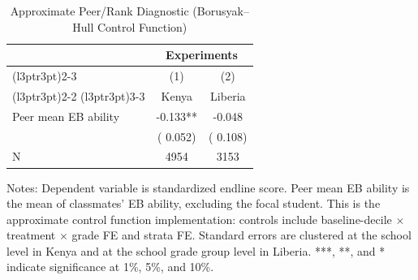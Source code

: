 \begin{table}[H]
\centering
\caption{Approximate Peer/Rank Diagnostic (Borusyak--Hull Control Function)}
\label{tab:peer_effects}
\begin{threeparttable}
\begin{tabular}[t]{lcc}
\toprule
\multicolumn{1}{c}{ } & \multicolumn{2}{c}{Experiments} \\
\cmidrule(l{3pt}r{3pt}){2-3}
\multicolumn{1}{c}{ } & \multicolumn{1}{c}{(1)} & \multicolumn{1}{c}{(2)} \\
\cmidrule(l{3pt}r{3pt}){2-2} \cmidrule(l{3pt}r{3pt}){3-3}
 & \multicolumn{1}{c}{Kenya} & \multicolumn{1}{c}{Liberia} \\
\midrule
Peer mean EB ability &  -0.133** &  -0.048 \\
 & (  0.052) & (  0.108) \\
\addlinespace
N & 4954 & 3153 \\
\bottomrule
\end{tabular}
\begin{tablenotes}[para]
\item Notes: Dependent variable is standardized endline score. Peer mean EB ability is the mean of classmates' EB ability, excluding the focal student. This is the approximate control function implementation: controls include baseline-decile $\times$ treatment $\times$ grade FE and strata FE\@. Standard errors are clustered at the school level in Kenya and at the school grade group level in Liberia. ***, **, and * indicate significance at 1\%, 5\%, and 10\%.
\end{tablenotes}
\end{threeparttable}
\end{table}
